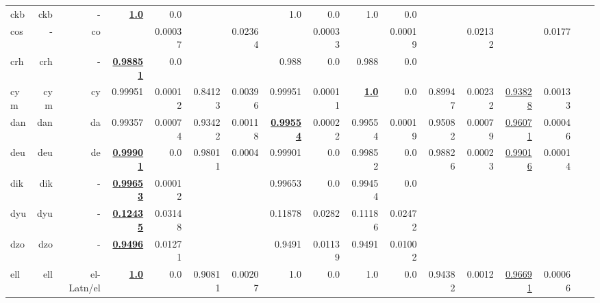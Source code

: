 \documentclass[11pt]{article}
\begin{document}
\begin{table*}[h]
{\begin{tabular}{lrrrrrrrrrrrrrrrr}
ckb         & ckb         & -         & \textbf{\underline{1.0}}         & 0.0         &          &          & 1.0         & 0.0         & 1.0         & 0.0         &          &          &          &          \\
cos         & -         & co         &          & 0.00037         &          & 0.02364         &          & 0.00033         &          & 0.00019         &          & 0.02132         &          & 0.0177         \\
crh         & crh         & -         & \textbf{\underline{0.98851}}         & 0.0         &          &          & 0.988         & 0.0         & 0.988         & 0.0         &          &          &          &          \\
cym         & cym         & cy         & 0.99951         & 0.00012         & 0.84123         & 0.00396         & 0.99951         & 0.00011         & \textbf{\underline{1.0}}         & 0.0         & 0.89947         & 0.00232         & \underline{0.93828}         & 0.00133         \\
dan         & dan         & da         & 0.99357         & 0.00074         & 0.93422         & 0.00118         & \textbf{\underline{0.99554}}         & 0.00022         & 0.99554         & 0.00019         & 0.95082         & 0.00079         & \underline{0.96071}         & 0.00046         \\
deu         & deu         & de         & \textbf{\underline{0.99901}}         & 0.0         & 0.98011         & 0.0004         & 0.99901         & 0.0         & 0.99852         & 0.0         & 0.98826         & 0.00023         & \underline{0.99016}         & 0.00014         \\
dik         & dik         & -         & \textbf{\underline{0.99653}}         & 0.00012         &          &          & 0.99653         & 0.0         & 0.99454         & 0.0         &          &          &          &          \\
dyu         & dyu         & -         & \textbf{\underline{0.12435}}         & 0.03148         &          &          & 0.11878         & 0.0282         & 0.11186         & 0.02472         &          &          &          &          \\
dzo         & dzo         & -         & \textbf{\underline{0.9496}}         & 0.01271         &          &          & 0.9491         & 0.01139         & 0.9491         & 0.01002         &          &          &          &          \\
ell         & ell         & el-Latn/el         & \textbf{\underline{1.0}}         & 0.0         & 0.90811         & 0.00207         & 1.0         & 0.0         & 1.0         & 0.0         & 0.94382         & 0.0012         & \underline{0.96691}         & 0.00066         \\

\end{tabular}}
\end{table*}
\end{document}
